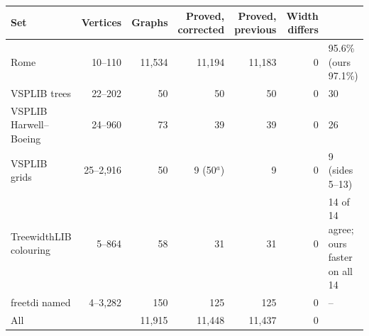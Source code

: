 \begin{tabular}{@{}lrrrrrl@{}}
\toprule
Set & Vertices & Graphs & Proved, corrected & Proved, previous & Width differs & \citet{CoudertMazauricNisse2016} \\
\midrule
Rome & 10--110 & 11,534 & 11,194 & 11,183 & 0 & 95.6\% (ours 97.1\%) \\
VSPLIB trees & 22--202 & 50 & 50 & 50 & 0 & 30 \\
VSPLIB Harwell--Boeing & 24--960 & 73 & 39 & 39 & 0 & 26 \\
VSPLIB grids & 25--2{,}916 & 50 & 9 (50$^{a}$) & 9 & 0 & 9 (sides 5--13) \\
TreewidthLIB colouring & 5--864 & 58 & 31 & 31 & 0 & 14 of 14 agree; ours faster on all 14 \\
freetdi named & 4--3{,}282 & 150 & 125 & 125 & 0 & -- \\
\midrule
All & & 11,915 & 11,448 & 11,437 & 0 & \\
\bottomrule
\end{tabular}
